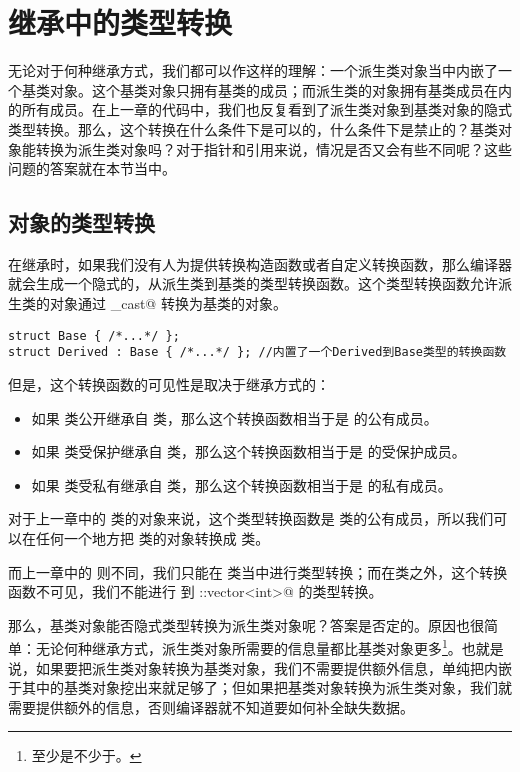 \section{继承中的类型转换}
无论对于何种继承方式，我们都可以作这样的理解：一个派生类对象当中内嵌了一个基类对象。这个基类对象只拥有基类的成员；而派生类的对象拥有基类成员在内的所有成员。在上一章的代码中，我们也反复看到了派生类对象到基类对象的隐式类型转换。那么，这个转换在什么条件下是可以的，什么条件下是禁止的？基类对象能转换为派生类对象吗？对于指针和引用来说，情况是否又会有些不同呢？这些问题的答案就在本节当中。\par
\subsection*{对象的类型转换}
在继承时，如果我们没有人为提供转换构造函数或者自定义转换函数，那么编译器就会生成一个隐式的，从派生类到基类的类型转换函数。这个类型转换函数允许派生类的对象通过 \lstinline@static_cast@ 转换为基类的对象。
\begin{lstlisting}
struct Base { /*...*/ };
struct Derived : Base { /*...*/ }; //内置了一个Derived到Base类型的转换函数
\end{lstlisting}\par
但是，这个转换函数的可见性是取决于继承方式的：
\begin{itemize}
    \item 如果 \lstinline@Derived@ 类公开继承自 \lstinline@Base@ 类，那么这个转换函数相当于是 \lstinline@Derived@ 的公有成员。
    \item 如果 \lstinline@Derived@ 类受保护继承自 \lstinline@Base@ 类，那么这个转换函数相当于是 \lstinline@Derived@ 的受保护成员。
    \item 如果 \lstinline@Derived@ 类受私有继承自 \lstinline@Base@ 类，那么这个转换函数相当于是 \lstinline@Derived@ 的私有成员。
\end{itemize}\par
对于上一章中的 \lstinline@Husky@ 类的对象来说，这个类型转换函数是 \lstinline@Husky@ 类的公有成员，所以我们可以在任何一个地方把 \lstinline@Husky@ 类的对象转换成 \lstinline@Dog@ 类。\par
而上一章中的 \lstinline@stack@ 则不同，我们只能在 \lstinline@stack@ 类当中进行类型转换；而在类之外，这个转换函数不可见，我们不能进行 \lstinline@stack@ 到 \lstinline@std::vector<int>@ 的类型转换。\par
那么，基类对象能否隐式类型转换为派生类对象呢？答案是否定的。原因也很简单：无论何种继承方式，派生类对象所需要的信息量都比基类对象更多\footnote{至少是不少于。}。也就是说，如果要把派生类对象转换为基类对象，我们不需要提供额外信息，单纯把内嵌于其中的基类对象挖出来就足够了；但如果把基类对象转换为派生类对象，我们就需要提供额外的信息，否则编译器就不知道要如何补全缺失数据。\par
